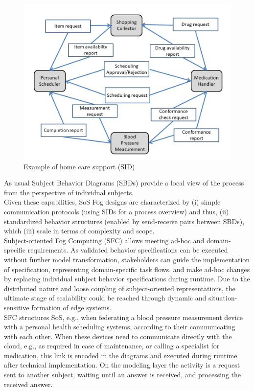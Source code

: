 \begin{figure}[htbp]
	\centering
	\includegraphics[width=0.6\linewidth] {Figures/Chapter5/Fog/homeCare.jpg}
	\caption[Example of home care support (SID)]{Example of home care support (SID)}
	\label{fig:homeCare}
\end{figure}


As usual Subject Behavior Diagrams (SBDs) provide a local view of the process from the perspective of individual subjects.
\\
Given these capabilities, SoS Fog designs are characterized by (i) simple communication protocols (using SIDs for a process overview) and thus, (ii) standardized behavior structures (enabled by send-receive pairs between SBDs), which (iii) scale in terms of complexity and scope.
\\
Subject-oriented Fog Computing (SFC) allows meeting ad-hoc and domain-specific requirements. As validated behavior specifications can be executed without further model transformation, stakeholders can guide the implementation of specification, representing domain-specific task flows, and make ad-hoc changes by replacing individual subject behavior specifications during runtime. Due to the distributed nature and loose coupling of subject-oriented representations, the ultimate stage of scalability could be reached through dynamic and situation-sensitive formation of edge systems.
\\
SFC structures SoS, e.g., when federating a blood pressure measurement device with a personal health scheduling systems, according to their communicating with each other. When these devices need to communicate directly with the cloud, e.g., as required in case of maintenance, or calling a specialist for medication, this link is encoded in the diagrams and executed during runtime after technical implementation. On the modeling layer the activity is a request sent to another subject, waiting until an answer is received, and processing the received answer.

